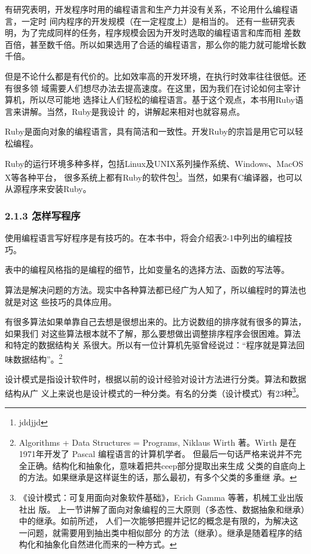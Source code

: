 \documentclass[11pt]{ctexart}
\begin{document}
有研究表明，开发程序时用的编程语言和生产力并没有关系，不论用什么编程语言，一定时
间内程序的开发规模（在一定程度上）是相当的。
还有一些研究表明，为了完成同样的任务，程序规模会因为开发时选取的编程语言和库而相
差数百倍，甚至数千倍。所以如果选用了合适的编程语言，那么你的能力就可能增长数千倍。

但是不论什么都是有代价的。比如效率高的开发环境，在执行时效率往往很低。还有很多领
域需要人们想尽办法去提高速度。在这里，因为我们在讨论如何主宰计算机，所以尽可能地
选择让人们轻松的编程语言。基于这个观点，本书用Ruby语言来讲解。当然，Ruby是我设计
的，讲解起来相对也就容易点。

Ruby是面向对象的编程语言，具有简洁和一致性。开发Ruby的宗旨是用它可以轻松编程。


Ruby的运行环境多种多样，包括Linux及UNIX系列操作系统、Windows、MacOS X等各种平台，
很多系统上都有Ruby的软件包\footnote{jddjjd}。当然，如果有C编译器，也可以从源程序来安装Ruby。

\subsubsection{2.1.3 怎样写程序}
\label{sec:orgb7ca6ff}

使用编程语言写好程序是有技巧的。在本书中，将会介绍表2-1中列出的编程技巧。

表中的编程风格指的是编程的细节，比如变量名的选择方法、函数的写法等。

算法是解决问题的方法。现实中各种算法都已经广为人知了，所以编程时的算法也就是对这
些技巧的具体应用。

有很多算法如果单靠自己去想是很想出来的。比方说数组的排序就有很多的算法，如果我们
对这些算法根本就不了解，那么要想做出调整排序程序会很困难。算法和特定的数据结构关
系很大。所以有一位计算机先驱曾经说过：“程序就是算法回味数据结构”。\footnote{Algorithms + Data Structures = Programs, Niklaus Wirth 著。Wirth 是在
1971年开发了 Pascal 编程语言的计算机学者。
但最后一句话严格来说并不完全正确。结构化和抽象化，意味着把共ceep部分提取出来生成
父类的自底向上的方法。如果继承是这样诞生的话，那么最初，有多个父类的多重继
承。}

设计模式是指设计软件时，根据以前的设计经验对设计方法进行分类。算法和数据结构从广
义上来说也是设计模式的一种分类。有名的分类（设计模式）有23种\footnote{《设计模式：可复用面向对象软件基础》，Erich Gamma 等著，机械工业出版社出
版。
上一节讲解了面向对象编程的三大原则（多态性、数据抽象和继承）中的继承。如前所述，
人们一次能够把握并记忆的概念是有限的，为解决这一问题，就需要用到抽出类中相似部分
的方法（继承）。继承是随着程序的结构化和抽象化自然进化而来的一种方式。}。
\end{document}
